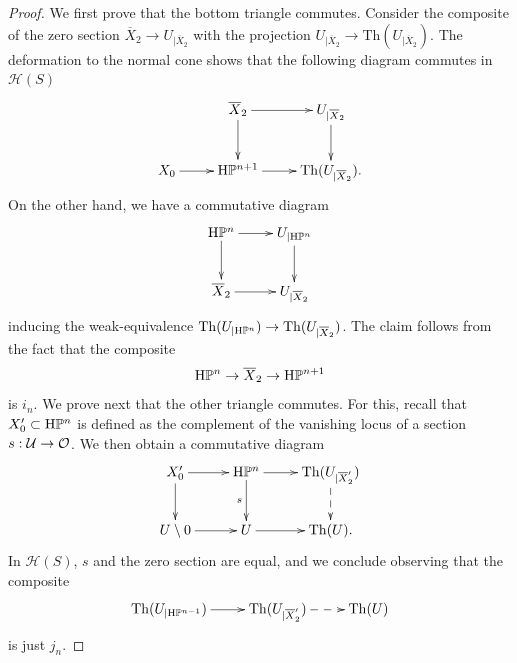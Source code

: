 \begin{num}
\begin{proof}
We first prove that the bottom triangle commutes. Consider the composite of the zero section $\overline X_2\to U_{\vert \overline X_2}$ with the projection $U_{\vert \overline X_2}\to\mathrm{Th}(U_{\vert \overline X_2})$. The deformation to the normal cone shows that the following diagram commutes in $\mathcal{H}(S)$ 
\[
\xymatrix{ & \overline X_2\ar[r]\ar[d] & U_{\vert \overline X_2}\ar[d] \\
X_0\ar[r] & \HP^{n+1}\ar[r] & \mathrm{Th}(U_{\vert \overline X_2}).}
\]
On the other hand, we have a commutative diagram
\[
\xymatrix{\HP^{n}\ar[r]\ar[d] & U_{\vert \HP^n}\ar[d] \\
\overline X_2\ar[r] & U_{\vert \overline X_2}}
\] 
inducing the weak-equivalence $\mathrm{Th}(U_{\vert \mathrm{H}\mathbb P^n})\to \mathrm{Th}(U_{\vert \overline X_2})$. The claim follows from the fact that the composite 
\[
\mathrm{H}\mathbb P^{n}\to \overline X_2\to \mathrm{H}\mathbb P^{n+1}
\]
is $i_n$. We prove next that the other triangle commutes. For this, recall that $X_0^\prime\subset \mathrm{H}\mathbb P^{n}$ is defined as the complement of the vanishing locus of a section $s:\mathcal{U}\to \mathcal O$. We then obtain a commutative diagram
\[
\xymatrix{X_0^\prime\ar[r]\ar[d] & \HP^{n}\ar[r]\ar[d]_-s & \mathrm{Th}(U_{\vert \overline X_2^\prime})\ar@{-->}[d] \\
U\setminus 0\ar[r] & U\ar[r] & \mathrm{Th}(U).
}
\]
In $\mathcal{H}(S)$, $s$ and the zero section are equal, and we conclude observing that the composite 
\[
\xymatrix{\mathrm{Th}(U_{\vert \HP^{n-1}})\ar[r] & \mathrm{Th}(U_{\vert \overline X_2^\prime})\ar@{-->}[r] & \mathrm{Th}(U)}
\]
is just $j_n$.
\end{proof}


\end{num}
